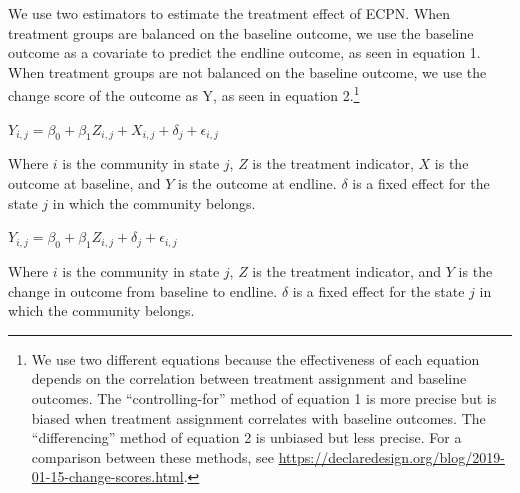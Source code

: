 \documentclass[11pt]{article}
\begin{document}
We use two estimators to estimate the treatment effect of ECPN. When
treatment groups are balanced on the baseline outcome, we use the
baseline outcome as a covariate to predict the endline outcome, as seen
in equation 1. When treatment groups are not balanced on the baseline
outcome, we use the change score of the outcome as Y, as seen in
equation 2.\footnote{We use two different equations because the
  effectiveness of each equation depends on the correlation between
  treatment assignment and baseline outcomes. The ``controlling-for''
  method of equation 1 is more precise but is biased when treatment
  assignment correlates with baseline outcomes. The ``differencing''
  method of equation 2 is unbiased but less precise. For a comparison
  between these methods, see
  \url{https://declaredesign.org/blog/2019-01-15-change-scores.html}.}

\(Y_{i,j} = \beta_0 + \beta_1Z_{i,j} + X_{i,j} + \delta_j + \epsilon_{i,j}\)

Where \(i\) is the community in state \(j\), \(Z\) is the treatment
indicator, \(X\) is the outcome at baseline, and \(Y\) is the outcome at
endline. \(\delta\) is a fixed effect for the state \(j\) in which the
community belongs.

\(Y_{i,j} = \beta_0 + \beta_1Z_{i,j} + \delta_j + \epsilon_{i,j}\)

Where \(i\) is the community in state \(j\), \(Z\) is the treatment
indicator, and \(Y\) is the change in outcome from baseline to endline.
\(\delta\) is a fixed effect for the state \(j\) in which the community
belongs.
\end{document}
